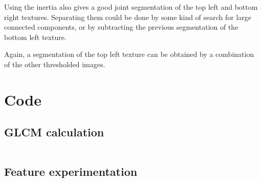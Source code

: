 \documentclass[a4paper]{article}
\begin{document}
Using the inertia also gives a good joint segmentation of the top left
and bottom right textures. Separating them could be done by some kind of
search for large connected components, or by subtracting the previous
segmentation of the bottom left texture.

Again, a segmentation of the top left texture can be obtained by a
combination of the other thresholded images.

\section{Code}
\label{app:code}

\subsection{GLCM calculation}
\inputminted{python}{../glcm.py}

\subsection{Feature experimentation}
\inputminted{python}{analysis.py}
\end{document}

